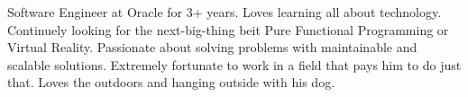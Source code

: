 

\begin{cvparagraph}

Software Engineer at Oracle for 3+ years.
Loves learning all about technology. Continuely looking for the next-big-thing beit Pure Functional Programming or Virtual Reality.
Passionate about solving problems with maintainable and scalable solutions. Extremely fortunate to work in a field that pays him to do just that.
Loves the outdoors and hanging outside with his dog.
\end{cvparagraph}
